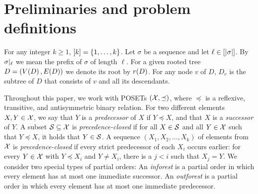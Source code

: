 \section{Preliminaries and problem definitions} \label{sec:preliminaries}



For any integer $k \geq 1$, $[k]=\mathopen{}\left\{ 1,\ldots,k \right\}$. 
Let $\sigma$ be a sequence and let $\ell\in[\mathopen{}\left| \sigma \right|]$. By $\sigma|_{\ell}$ we mean the prefix of $\sigma$ of length $\ell$. For a given rooted tree $D=\mathopen{}\left( V\mathopen{}\left( D \right), E\mathopen{}\left( D \right) \right)$ we denote its root by $r\mathopen{}\left( D \right)$. 
For any node $v$ of $D$, $D_v$ is the subtree of $D$ that consists of $v$ and all its descendants.


Throughout this paper, we work with POSETs $(\mathcal{X}, \preceq)$, where $\preceq$ is a reflexive, transitive, and antisymmetric binary relation.
For two different elements $X, Y \in \mathcal{X}$, we say that $Y$ is a \emph{predecessor} of $X$ if $Y \preceq X$, and that $X$ is a \emph{successor} of $Y$.
A subset $\mathcal{S} \subseteq \mathcal{X}$ is \emph{precedence-closed} if for all $X \in \mathcal{S}$ and all $Y \in \mathcal{X}$ such that $Y \preceq X$, it holds that $Y \in \mathcal{S}$.
A sequence $(X_1, X_2, \ldots, X_k)$ of elements from $\mathcal{X}$ is \emph{precedence-closed} if every strict predecessor of each $X_i$ occurs earlier: for every $Y\in\mathcal{X}$ with $Y\preceq X_i$ and $Y\neq X_i$, there is a $j<i$ such that $X_j=Y$. We consider two special types of partial orders: An \emph{inforest} is a partial order in which every element has at most one immediate successor. An \emph{outforest} is a partial order in which every element has at most one immediate predecessor.

